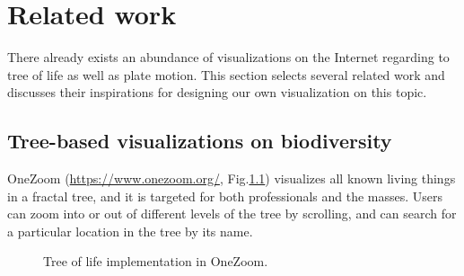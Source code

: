 \documentclass[11pt, a4paper,oneside,chapterprefix=false]{scrbook}
\begin{document}
\chapter{Related work} \label{chp:related_work}

There already exists an abundance of visualizations on the Internet regarding to tree of life as well as plate motion. This section selects several related work and discusses their inspirations for designing our own visualization on this topic. 

\section{Tree-based visualizations on biodiversity}
OneZoom (\url{https://www.onezoom.org/}, Fig.\ref{fig:OneZoom}) visualizes all known living things in a fractal tree, and it is targeted for both professionals and the masses. Users can zoom into or out of different levels of the tree by scrolling, and can search for a particular location in the tree by its name. 

\begin{figure}[h]
	\centering
	\hfill
	\caption{Tree of life implementation in OneZoom. }
	\label{fig:OneZoom}
\end{figure}
\end{document}

